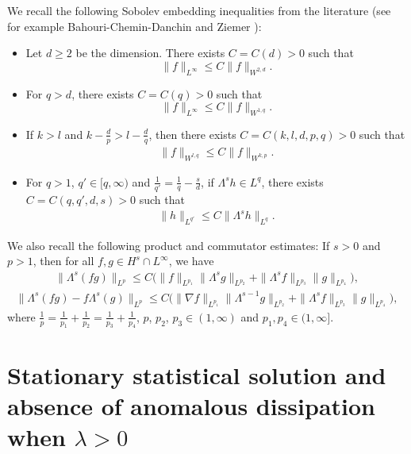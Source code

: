 \documentclass[reqno]{amsart}%
\theoremstyle{definition}
\theoremstyle{remark}
\numberwithin{equation}{section}
\newcommand{\1}{\mathbf{1}}
\numberwithin{equation}{section}
\numberwithin{theorem}{section}
\numberwithin{figure}{section}
\begin{document}
We recall the following Sobolev embedding inequalities from the literature (see for example Bahouri-Chemin-Danchin \cite{BCD11} and Ziemer \cite{Z89}): 
\begin{itemize}
\item Let $d\ge2$ be the dimension. There exists $C=C(d)>0$ such that
\begin{equation}
\|f\|_{L^\infty }\le C \|f\|_{W^{2,d} }.\label{L infty bound 1}
\end{equation}
\item For $q>d$, there exists $C=C(q)>0$ such that
\begin{equation}
\|f\|_{L^\infty }\le C \|f\|_{W^{1,q} }.\label{L infty bound 2}
\end{equation}
\item If $k>l$ and $k-\frac{d}{p}>l-\frac{d}{q}$, then there exists $C=C(k,l,d,p,q)>0$ such that
\begin{align}
\|f\|_{W^{l,q}}\le C\|f\|_{W^{k,p}}.\label{Kondrachov embedding theorem}
\end{align}
\item For $q>1$, $q'\in[q,\infty)$ and $\frac{1}{q'}=\frac{1}{q}-\frac{s}{d}$, if $\Lambda^s h\in L^q$, there exists $C=C(q,q',d,s)>0$ such that
\begin{align}\label{Sobolev inequality}
\|h\|_{L^{q'}}\le C\|\Lambda^s h\|_{L^{q}}.
\end{align}
\end{itemize}

We also recall the following product and commutator estimates: If $s>0$ and $p>1$, then for all $f,g\in H^s\cap L^\infty$, we have
\begin{align}\label{product estimate}
\|\Lambda^s(fg)\|_{L^p}\le C\Big(\|f\|_{L^{p_1}}\|\Lambda^s g\|_{L^{p_2}}+\|\Lambda^s f\|_{L^{p_3}}\|g\|_{L^{p_4}}\Big),
\end{align}
\begin{align}\label{commutator estimate}
\|\Lambda^s(fg)-f\Lambda^s(g)\|_{L^p}\le C\Big(\|\nabla f\|_{L^{p_1}}\|\Lambda^{s-1} g\|_{L^{p_2}}+\|\Lambda^s f\|_{L^{p_3}}\|g\|_{L^{p_4}}\Big),
\end{align}
where $\frac{1}{p}=\frac{1}{p_1}+\frac{1}{p_2}=\frac{1}{p_3}+\frac{1}{p_4}$, $p$, $p_2$, $p_3\in(1,\infty)$ and $p_1,p_4\in(1,\infty]$. 

\section{Stationary statistical solution and absence of anomalous dissipation when $\lambda>0$}\label{absence of anomalous dissipation section}
\end{document}
